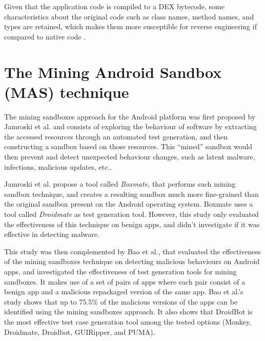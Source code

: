 Given that the application code is compiled to a DEX bytecode, some characteristics about the original code such as class names, method names, and types are retained, which makes them more susceptible for reverse engineering if compared to native code \cite{hamilton_evaluation_2009}.

\section{The Mining Android Sandbox (MAS) technique}

The mining sandboxes approach for the Android platform was first proposed by Jamroski et al. and consists of exploring the behaviour of software by extracting the accessed resources through an automated test generation, and then constructing a sandbox based on those resources\cite{jamrozik_mining_2016}. This ``mined'' sandbox would then prevent and detect unexpected behaviour changes, such as latent malware, infections, malicious updates, etc..

Jamroski et al. propose a tool called \textit{Boxmate}, that performs such mining sandbox technique, and creates a resulting sandbox much more fine-grained than the original sandbox present on the Android operating system. Boxmate uses a tool called \textit{Droidmate} as test generation tool. However, this study only evaluated the effectiveness of this technique on benign apps, and didn't investigate if it was effective in detecting malware.

This study was then complemented by Bao et al., that evaluated the effectiveness of the mining sandboxes technique on detecting malicious behaviours on Android apps, and investigated the effectiveness of test generation tools for mining sandboxes\cite{bao_mining_2018}. It makes use of a set of pairs of apps where each pair consist of a benign app and a malicious repackaged version of the same app. Bao et al.'s study shows that up to 75.5\% of the malicious versions of the apps can be identified using the mining sandboxes approach. It also shows that DroidBot\cite{li_droidbot_2017} is the most effective test case generation tool among the tested options (Monkey, Droidmate, Droidbot, GUIRipper, and PUMA).


